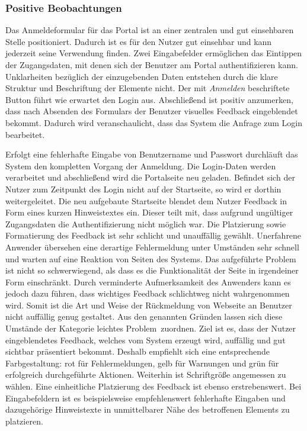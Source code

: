 
\subsubsection*{Positive Beobachtungen}
Das Anmeldeformular für das Portal ist an einer zentralen und gut einsehbaren Stelle positioniert. Dadurch ist es für den Nutzer gut einsehbar und kann jederzeit seine Verwendung finden. Zwei Eingabefelder ermöglichen das Eintippen der Zugangsdaten, mit denen sich der Benutzer am Portal authentifizieren kann. Unklarheiten bezüglich der einzugebenden Daten entstehen durch die klare Struktur und Beschriftung der Elemente nicht. Der mit \emph{Anmelden} beschriftete Button führt wie erwartet den Login aus. Abschließend ist positiv anzumerken, dass nach Absenden des Formulars der Benutzer visuelles Feedback eingeblendet bekommt. Dadurch wird veranschaulicht, dass das System die Anfrage zum Login bearbeitet.

{
	Erfolgt eine fehlerhafte Eingabe von Benutzername und Passwort durchläuft das System den kompletten Vorgang der Anmeldung. Die Login-Daten werden verarbeitet und abschließend wird die Portalseite neu geladen. Befindet sich der Nutzer zum Zeitpunkt des Login nicht auf der Startseite, so wird er dorthin weitergeleitet. Die neu aufgebaute Startseite blendet dem Nutzer Feedback in Form eines kurzen Hinweistextes ein. Dieser teilt mit, dass aufgrund ungültiger Zugangsdaten die Authentifizierung nicht möglich war. Die Platzierung sowie Formatierung des Feedback ist sehr schlicht und unauffällig gewählt. Unerfahrene Anwender übersehen eine derartige Fehlermeldung unter Umständen sehr schnell und warten auf eine Reaktion von Seiten des Systems.
}
{
	Das aufgeführte Problem ist nicht so schwerwiegend, als dass es die Funktionalität der Seite in irgendeiner Form einschränkt. Durch verminderte Aufmerksamkeit des Anwenders kann es jedoch dazu führen, dass wichtiges Feedback schlichtweg nicht wahrgenommen wird. Somit ist die Art und Weise der Rückmeldung von Webseite an Benutzer nicht auffällig genug gestaltet. Aus den genannten Gründen lassen sich diese Umstände der Kategorie \glqq leichtes Problem\grqq ~zuordnen.		
}
{
	Ziel ist es, dass der Nutzer eingeblendetes Feedback, welches vom System erzeugt wird, auffällig und gut sichtbar präsentiert bekommt. Deshalb empfiehlt sich eine entsprechende Farbgestaltung: rot für Fehlermeldungen, gelb für Warnungen und grün für erfolgreich durchgeführte Aktionen. Weiterhin ist Schriftgröße angemessen zu wählen. Eine einheitliche Platzierung des Feedback ist ebenso erstrebenswert. Bei Eingabefeldern ist es beispielsweise empfehlenswert fehlerhafte Eingaben und dazugehörige Hinweistexte in unmittelbarer Nähe des betroffenen Elements zu platzieren.
}


